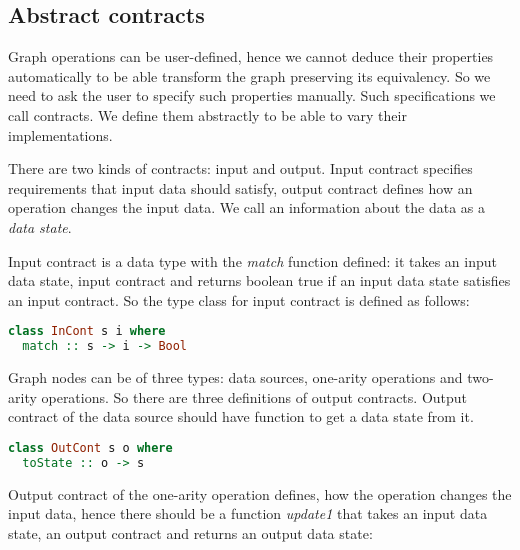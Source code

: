 
\subsection{Abstract contracts}


Graph operations can be user-defined, hence we cannot deduce their properties automatically to be able transform the graph preserving its equivalency.
So we need to ask the user to specify such properties manually.
Such specifications we call contracts.
We define them abstractly to be able to vary their implementations.

There are two kinds of contracts: input and output.
Input contract specifies requirements that input data should satisfy, output contract defines how an operation changes the input data.
We call an information about the data as a {\em data state}.

Input contract is a data type with the {\em match} function defined: it takes an input data state, input contract and returns boolean true if an input data state satisfies an input contract.
So the type class for input contract is defined as follows:

\begin{lstlisting}[language=Haskell]
class InCont s i where
  match :: s -> i -> Bool
\end{lstlisting}

Graph nodes can be of three types: data sources, one-arity operations and two-arity operations.
So there are three definitions of output contracts.
Output contract of the data source should have function to get a data state from it.

\begin{lstlisting}[language=Haskell]
class OutCont s o where
  toState :: o -> s
\end{lstlisting}

Output contract of the one-arity operation defines, how the operation changes the input data, hence there should be a function {\em update1} that takes an input data state, an output contract and returns an output data state:

